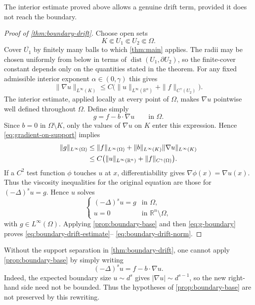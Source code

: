 \documentclass[reqno]{amsart}
\numberwithin{equation}{section}
\theoremstyle{plain}
\theoremstyle{definition}
\theoremstyle{remark}
\newcommand{\R}{\mathbb R}
\newcommand{\rev}[1]{#1}
\begin{document}
The interior estimate proved above allows a genuine drift term, provided it
does not reach the boundary.

\begin{proof}[Proof of \cref{thm:boundary-drift}]
Choose open sets
\[
 K\Subset U_1\Subset U_2\Subset\Omega.
\]
Cover $\overline{U_1}$ by finitely many balls to which
\cref{thm:main} applies.  \rev{The radii may be chosen uniformly from below
in terms of $\operatorname{dist}(U_1,\partial U_2)$, so the finite-cover
constant depends only on the quantities stated in the theorem.}  For any fixed admissible interior exponent
$\alpha\in(0,\gamma)$ this gives
\begin{equation}\label{eq:gradient-on-support}
 \|\nabla u\|_{L^\infty(K)}
 \le C\bigl(
 \|u\|_{L^\infty(\R^n)}+
 \|f\|_{C^\gamma(U_2)}\bigr).
\end{equation}
The interior estimate, applied locally at every point of $\Omega$, makes
$\nabla u$ pointwise well defined throughout $\Omega$.  Define simply
\[
 g=f-b\cdot\nabla u\qquad\text{in }\Omega.
\]
Since $b=0$ in $\Omega\setminus K$, only the values of $\nabla u$ on $K$
enter this expression.  Hence
\eqref{eq:gradient-on-support} implies
\begin{align}\label{eq:g-boundary}
 \|g\|_{L^\infty(\Omega)}
 &\le \|f\|_{L^\infty(\Omega)}
 +\|b\|_{L^\infty(K)}
   \|\nabla u\|_{L^\infty(K)}\notag\\
 &\le C\bigl(
 \|u\|_{L^\infty(\R^n)}+
 \|f\|_{C^\gamma(\Omega)}\bigr).
\end{align}
\rev{If a $C^2$ test function $\phi$ touches $u$ at $x$, differentiability
gives $\nabla\phi(x)=\nabla u(x)$.  Thus the viscosity inequalities for the
original equation are those for $(-\Delta)^su=g$.}  Hence $u$ solves
\[
 \begin{cases}
 (-\Delta)^su=g&\text{in }\Omega,\\
 u=0&\text{in }\R^n\setminus\Omega,
 \end{cases}
\]
with $g\in L^\infty(\Omega)$.  Applying \cref{prop:boundary-base} and then
\eqref{eq:g-boundary} proves \eqref{eq:boundary-drift-estimate}--
\eqref{eq:boundary-drift-norm}.
\end{proof}

Without the support separation in \cref{thm:boundary-drift}, one cannot
apply \cref{prop:boundary-base} by simply writing
\[
 (-\Delta)^su=f-b\cdot\nabla u.
\]
Indeed, the expected boundary size $u\sim d^s$ gives
$|\nabla u|\sim d^{s-1}$, so the new right-hand side need not be bounded.
Thus the hypotheses of \cref{prop:boundary-base} are not preserved by this
rewriting.
\end{document}
